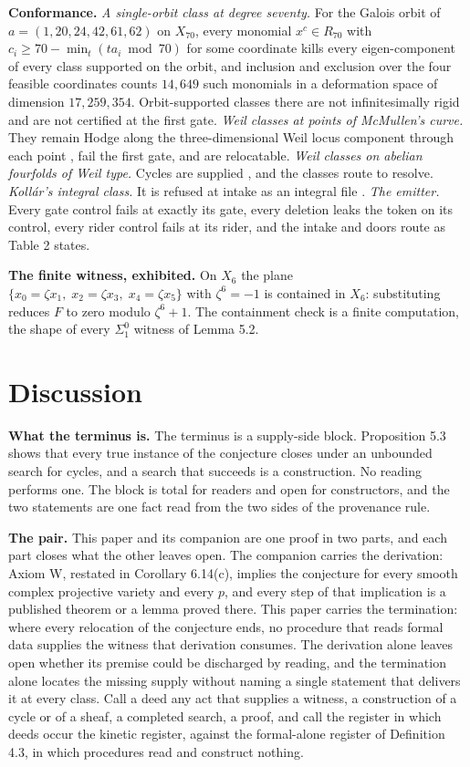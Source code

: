 \documentclass[10pt,twocolumn]{article}
\begin{document}
\textbf{Conformance.} \emph{A single-orbit class at degree seventy.} For
the Galois orbit of \(a=(1,20,24,42,61,62)\) on \(X_{70}\), every
monomial \(x^c\in R_{70}\) with \(c_i\ge 70-\min_t(ta_i\bmod 70)\) for
some coordinate kills every eigen-component of every class supported on
the orbit, and inclusion and exclusion over the four feasible
coordinates counts \(14{,}649\) such monomials in a deformation space of
dimension \(17{,}259{,}354\). Orbit-supported classes there are not
infinitesimally rigid and are not certified at the first gate.
\emph{Weil classes at points of McMullen's curve.} They remain Hodge
along the three-dimensional Weil locus component through each point
\cite{mostaed2026}, fail the first gate, and are relocatable. \emph{Weil
classes on abelian fourfolds of Weil type.} Cycles are supplied
\cite{markman2025b}, and the classes route to resolve. \emph{Kollár's
integral class.} It is refused at intake as an integral file
\cite{kollar1992}. \emph{The emitter.} Every gate control fails at
exactly its gate, every deletion leaks the token on its control, every
rider control fails at its rider, and the intake and doors route as
Table 2 states.

\textbf{The finite witness, exhibited.} On \(X_6\) the plane
\(\{x_0=\zeta x_1,\;x_2=\zeta x_3,\;x_4=\zeta x_5\}\) with
\(\zeta^6=-1\) is contained in \(X_6\): substituting reduces \(F\) to
zero modulo \(\zeta^6+1\). The containment check is a finite
computation, the shape of every \(\Sigma^0_1\) witness of Lemma 5.2.

\hypertarget{discussion}{%
\section{Discussion}\label{discussion}}

\textbf{What the terminus is.} The terminus is a supply-side block.
Proposition 5.3 shows that every true instance of the conjecture closes
under an unbounded search for cycles, and a search that succeeds is a
construction. No reading performs one. The block is total for readers
and open for constructors, and the two statements are one fact read from
the two sides of the provenance rule.

\textbf{The pair.} This paper and its companion \cite{islam2026w} are
one proof in two parts, and each part closes what the other leaves open.
The companion carries the derivation: Axiom W, restated in Corollary
6.14(c), implies the conjecture for every smooth complex projective
variety and every \(p\), and every step of that implication is a
published theorem or a lemma proved there. This paper carries the
termination: where every relocation of the conjecture ends, no procedure
that reads formal data supplies the witness that derivation consumes.
The derivation alone leaves open whether its premise could be discharged
by reading, and the termination alone locates the missing supply without
naming a single statement that delivers it at every class. Call a deed
any act that supplies a witness, a construction of a cycle or of a
sheaf, a completed search, a proof, and call the register in which deeds
occur the kinetic register, against the formal-alone register of
Definition 4.3, in which procedures read and construct nothing.
\end{document}
